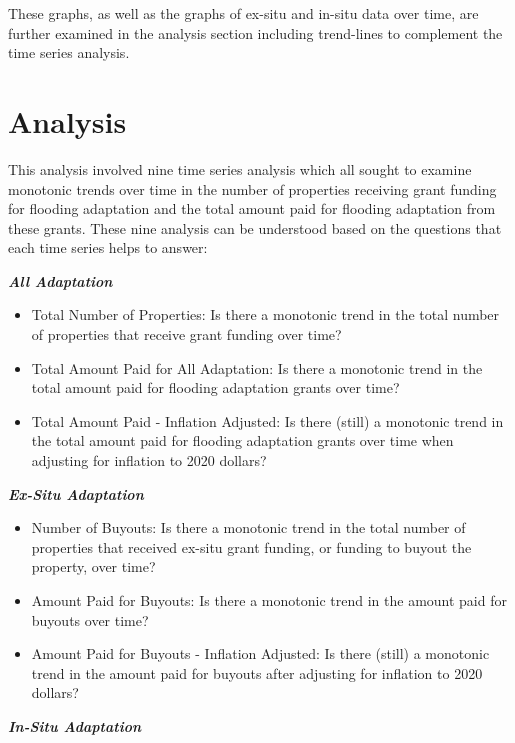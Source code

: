 \documentclass[
  12pt,
]{article}
\begin{document}
These graphs, as well as the graphs of ex-situ and in-situ data over
time, are further examined in the analysis section including trend-lines
to complement the time series analysis.

\newpage

\hypertarget{analysis}{%
\section{Analysis}\label{analysis}}

This analysis involved nine time series analysis which all sought to
examine monotonic trends over time in the number of properties receiving
grant funding for flooding adaptation and the total amount paid for
flooding adaptation from these grants. These nine analysis can be
understood based on the questions that each time series helps to answer:

\textbf{\emph{All Adaptation}}

\begin{itemize}
\item
  Total Number of Properties: Is there a monotonic trend in the total
  number of properties that receive grant funding over time?
\item
  Total Amount Paid for All Adaptation: Is there a monotonic trend in
  the total amount paid for flooding adaptation grants over time?
\item
  Total Amount Paid - Inflation Adjusted: Is there (still) a monotonic
  trend in the total amount paid for flooding adaptation grants over
  time when adjusting for inflation to 2020 dollars?
\end{itemize}

\textbf{\emph{Ex-Situ Adaptation}}

\begin{itemize}
\item
  Number of Buyouts: Is there a monotonic trend in the total number of
  properties that received ex-situ grant funding, or funding to buyout
  the property, over time?
\item
  Amount Paid for Buyouts: Is there a monotonic trend in the amount paid
  for buyouts over time?
\item
  Amount Paid for Buyouts - Inflation Adjusted: Is there (still) a
  monotonic trend in the amount paid for buyouts after adjusting for
  inflation to 2020 dollars?
\end{itemize}

\textbf{\emph{In-Situ Adaptation}}
\end{document}
